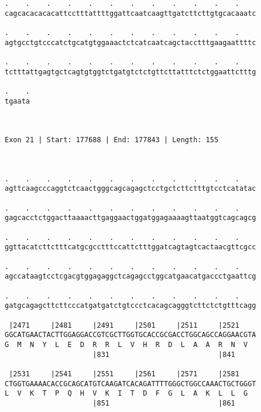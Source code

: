 \documentclass{article}
\begin{document}
\begin{Verbatim}
.    .    .    .    .    .    .    .    .    .    .    .    
cagcacacacacattcctttattttggattcaatcaagttgatcttcttgtgcacaaatc
                                                            
.    .    .    .    .    .    .    .    .    .    .    .    
agtgcctgtcccatctgcatgtggaaactctcatcaatcagctacctttgaagaattttc
                                                            
.    .    .    .    .    .    .    .    .    .    .    .    
tctttattgagtgctcagtgtggtctgatgtctctgttcttatttctctggaattctttg
                                                            
.    .
tgaata
      
      
 
Exon 21 | Start: 177688 | End: 177843 | Length: 155



.    .    .    .    .    .    .    .    .    .    .    .    
agttcaagcccaggtctcaactgggcagcagagctcctgctcttctttgtcctcatatac
                                                            
.    .    .    .    .    .    .    .    .    .    .    .    
gagcacctctggacttaaaacttgaggaactggatggagaaaagttaatggtcagcagcg
                                                            
.    .    .    .    .    .    .    .    .    .    .    .    
ggttacatcttctttcatgcgcctttccattctttggatcagtagtcactaacgttcgcc
                                                            
.    .    .    .    .    .    .    .    .    .    .    .    
agccataagtcctcgacgtggagaggctcagagcctggcatgaacatgaccctgaattcg
                                                            
.    .    .    .    .    .    .    .    .    .    .    .    
gatgcagagcttcttcccatgatgatctgtccctcacagcagggtcttctctgtttcagg
                                                            
 |2471     |2481     |2491     |2501     |2511     |2521    
GGCATGAACTACTTGGAGGACCGTCGCTTGGTGCACCGCGACCTGGCAGCCAGGAACGTA
G  M  N  Y  L  E  D  R  R  L  V  H  R  D  L  A  A  R  N  V  
                     |831                          |841     
  
 |2531     |2541     |2551     |2561     |2571     |2581    
CTGGTGAAAACACCGCAGCATGTCAAGATCACAGATTTTGGGCTGGCCAAACTGCTGGGT
L  V  K  T  P  Q  H  V  K  I  T  D  F  G  L  A  K  L  L  G  
                     |851                          |861     
  

\end{Verbatim}
\end{document}
